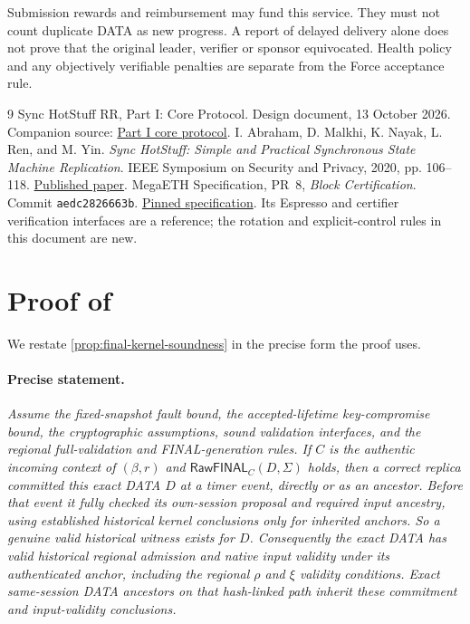 \documentclass[11pt,a4paper]{article}
\newcommand{\tagg}[1]{\ensuremath{\mathsf{#1}}}
\newcounter{protocol}
\begin{document}
Submission rewards and reimbursement may fund this service. They must not
count duplicate DATA as new progress. A report of delayed delivery
alone does not prove that the original leader, verifier or sponsor
equivocated. Health policy and any objectively verifiable penalties
are separate from the Force acceptance rule.

\begingroup\small
\begin{thebibliography}{9}
Sync HotStuff RR, Part I: Core Protocol. Design document, 13 October 2026.
Companion source: \href{run:sync_hotstuff_rr_part1_core.tex}{Part I core protocol}.
I. Abraham, D. Malkhi, K. Nayak, L. Ren, and M. Yin.
\emph{Sync HotStuff: Simple and Practical Synchronous State Machine Replication}.
IEEE Symposium on Security and Privacy, 2020, pp. 106--118.
\href{https://conferences.computer.org/sp/pdfs/sp/2020/349700a106.pdf}{Published paper}.
MegaETH Specification, PR~8, \emph{Block Certification}.
Commit \texttt{aedc2826663b}.
\href{https://github.com/megaeth-labs/specification/tree/aedc2826663b134ee25d26bea17e70c6d23d321c/specs/block-certification}{Pinned specification}.
Its Espresso and certifier verification interfaces are a reference;
the rotation and explicit-control rules in this document are new.
\end{thebibliography}
\endgroup
\appendix
\section{Proof of \texorpdfstring{}{the FINAL kernel proposition}}
\label{app:final-kernel-proof}
We restate \cref{prop:final-kernel-soundness} in the precise form the
proof uses.

\paragraph{Precise statement.}
\textit{Assume the fixed-snapshot fault bound, the accepted-lifetime
key-compromise bound, the cryptographic assumptions, sound validation
interfaces, and the regional full-validation and FINAL-generation rules.
If $C$ is the authentic incoming context of $(\beta,r)$ and
$\tagg{RawFINAL}_C(D,\Sigma)$ holds, then a correct replica committed
this exact DATA $D$ at a timer event, directly or as an ancestor. Before
that event it fully checked its own-session proposal and required input
ancestry, using established historical kernel conclusions only for
inherited anchors. So a genuine valid historical witness exists for $D$.
Consequently the exact DATA has valid historical regional admission and
native input validity under its authenticated anchor, including the
regional $\rho$ and $\xi$ validity conditions. Exact same-session DATA
ancestors on that hash-linked path inherit these commitment and
input-validity conclusions.}
\end{document}
